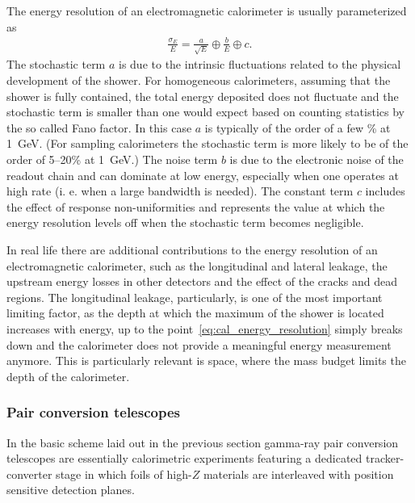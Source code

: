 The energy resolution of an electromagnetic calorimeter is usually parameterized as
\begin{align}\label{eq:cal_energy_resolution}
  \frac{\sigma_E}{E} = \frac{a}{\sqrt{E}} \oplus \frac{b}{E} \oplus c.
\end{align}
The stochastic term $a$ is due to the intrinsic fluctuations related to the
physical development of the shower. For homogeneous calorimeters, assuming that
the shower is fully contained, the total energy deposited does not fluctuate and
the stochastic term is smaller than one would expect based on counting statistics
by the so called Fano factor. In this case $a$ is typically of the order of a
few \% at 1~GeV. (For sampling calorimeters the stochastic term is more likely to
be of the order of  5--20\% at 1~GeV.) The noise term $b$ is due to the electronic
noise of the readout chain and can dominate at low energy, especially when one
operates at high rate (i. e. when a large bandwidth is needed). The constant
term $c$ includes the effect of response non-uniformities and represents the
value at which the energy resolution levels off when the stochastic term becomes
negligible.

In real life there are additional contributions to the energy resolution of an
electromagnetic calorimeter, such as the longitudinal and lateral leakage, the
upstream energy losses in other detectors and the effect of the cracks and dead
regions. The longitudinal leakage, particularly, is one of the most important
limiting factor, as the depth at which the maximum of the shower is located
increases with energy, up to the point~\eqref{eq:cal_energy_resolution} simply
breaks down and the calorimeter does not provide a meaningful energy measurement
anymore. This is particularly relevant is space, where the mass budget limits
the depth of the calorimeter.


\subsubsection{Pair conversion telescopes}

In the basic scheme laid out in the previous section gamma-ray pair conversion
telescopes are essentially calorimetric experiments featuring a dedicated
tracker-converter stage in which foils of high-$Z$ materials are interleaved with position
sensitive detection planes.

